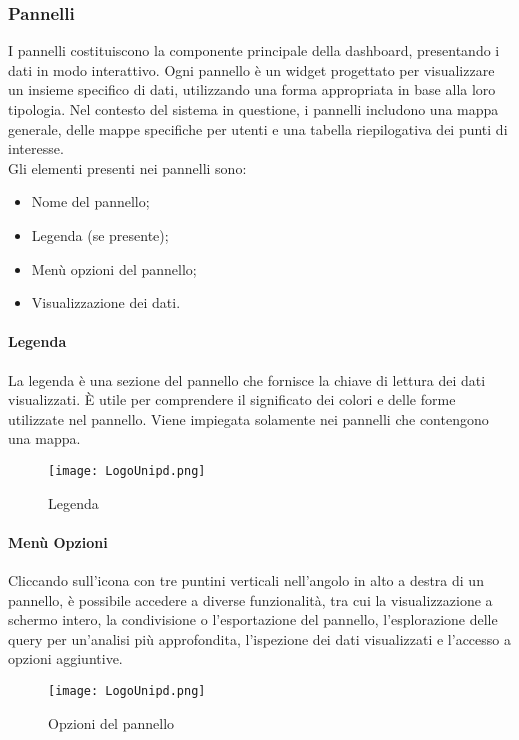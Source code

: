 \documentclass[10pt]{article}
\begin{document}
\begin{justify}
    \subsubsection{Pannelli}
    I pannelli costituiscono la componente principale della dashboard, presentando i dati in modo interattivo. Ogni pannello è un widget progettato per visualizzare un insieme specifico di dati, utilizzando una forma appropriata in base alla loro tipologia. Nel contesto del sistema in questione, i pannelli includono una mappa generale, delle mappe specifiche per utenti e una tabella riepilogativa dei punti di interesse.\\
    Gli elementi presenti nei pannelli sono:
    \begin{itemize}
        \item Nome del pannello;
        \item Legenda (se presente);
        \item Menù opzioni del pannello;
        \item Visualizzazione dei dati.
    \end{itemize}

    \paragraph{Legenda}
    La legenda è una sezione del pannello che fornisce la chiave di lettura dei dati visualizzati. È utile per comprendere il significato dei colori e delle forme utilizzate nel pannello. Viene impiegata solamente nei pannelli che contengono una mappa.
    \begin{figure}[H]
    \centering
    \texttt{[image: LogoUnipd.png]}
    \caption{Legenda}
    \end{figure}

    \paragraph{Menù Opzioni}
    Cliccando sull'icona con tre puntini verticali nell'angolo in alto a destra di un pannello, è possibile accedere a diverse funzionalità, tra cui la visualizzazione a schermo intero, la condivisione o l'esportazione del pannello, l'esplorazione delle query per un'analisi più approfondita, l'ispezione dei dati visualizzati e l'accesso a opzioni aggiuntive.
    \begin{figure}[H]
    \centering
    \texttt{[image: LogoUnipd.png]}
    \caption{Opzioni del pannello}
    \end{figure}


\end{justify}
\end{document}
